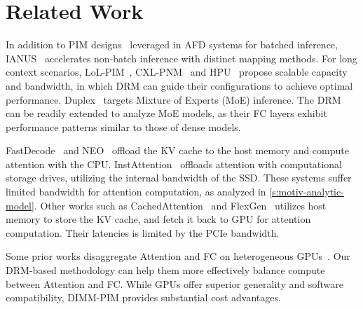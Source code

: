 \section{Related Work}




\label{subs:motiv-related-work}


In addition to PIM designs~\cite{park2024attacc,heo2024neupims} leveraged in AFD systems for batched inference,
IANUS~\cite{seo2024ianus,li2025h2llm} accelerates non-batch inference with distinct mapping methods.
For long context scenarios, LoL-PIM~\cite{kwon2025lolpim}, CXL-PNM~\cite{park2024cxlpnm} and HPU~\cite{rhee2025hpu} propose scalable capacity and bandwidth,
in which DRM can guide their configurations to achieve optimal performance.
Duplex~\cite{yun2024duplex} targets Mixture of Experts (MoE) inference. 
The DRM can be readily extended to analyze MoE models, as their FC layers exhibit performance patterns similar to those of dense models.

FastDecode~\cite{he2024fastdecode} and NEO~\cite{jiang2024neo} offload the KV cache to the host memory and compute attention with the CPU. 
InstAttention~\cite{pan2025instattention} offloads attention with computational storage drives, utilizing the internal bandwidth of the SSD.
These systems suffer limited bandwidth for attention computation, as analyzed in \textsection\ref{s:motiv-analytic-model}.
Other works such as CachedAttention~\cite{Gao2024cachedattention} and FlexGen~\cite{sheng2023flexgen} utilizes host memory to store the KV cache, and fetch it back to GPU for attention computation.
Their latencies is limited by the PCIe bandwidth.

Some prior works disaggregate Attention and FC on heterogeneous GPUs~\cite{step3blog,step3system,zhu2025megascaleinfer}.
Our DRM-based methodology can help them more effectively balance compute between Attention and FC. 
While GPUs offer superior generality and software compatibility, DIMM-PIM provides substantial cost advantages.

























